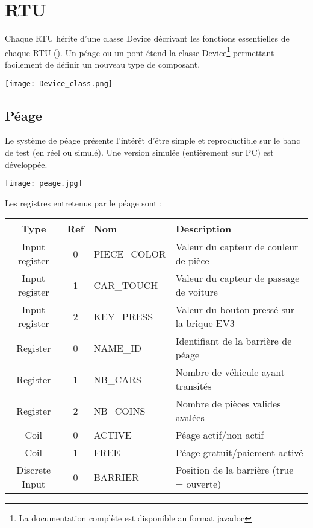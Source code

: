 \documentclass[10pt,a4paper]{article}
\begin{document}
\section{RTU}

Chaque RTU hérite d'une classe Device décrivant les fonctions essentielles de chaque RTU ().
Un péage ou un pont étend la classe Device\footnote{La documentation complète est disponible au format javadoc} permettant facilement de définir un nouveau type de composant.

\begin{center}
\texttt{[image: Device\_class.png]}
\end{center}



\subsection{Péage}

Le système de péage présente l'intérêt d'être simple et reproductible sur le banc de test (en réel ou simulé).
Une version simulée (entièrement sur PC) est développée.

\begin{center}
\texttt{[image: peage.jpg]}
\end{center}

Les registres entretenus par le péage sont :

\begin{tabular}{|c|c|l|l|}
\hline 
\textbf{Type} & \textbf{Ref} & \textbf{Nom} & \textbf{Description} \\ 
\hline 
Input register & 0 & PIECE\_COLOR & Valeur du capteur de couleur de pièce \\ 
\hline 
Input register & 1 & CAR\_TOUCH & Valeur du capteur de passage de voiture \\ 
\hline 
Input register & 2 & KEY\_PRESS & Valeur du bouton pressé sur la brique EV3 \\ 
\hline 
Register & 0 & NAME\_ID & Identifiant de la barrière de péage \\ 
\hline 
Register & 1 & NB\_CARS & Nombre de véhicule ayant transités \\ 
\hline 
Register & 2 & NB\_COINS & Nombre de pièces valides avalées \\ 
\hline 
Coil & 0 & ACTIVE & Péage actif/non actif \\ 
\hline 
Coil & 1 & FREE & Péage gratuit/paiement activé \\ 
\hline 
Discrete Input & 0 & BARRIER & Position de la barrière (true = ouverte) \\ 
\hline 
\end{tabular} 
\end{document}
